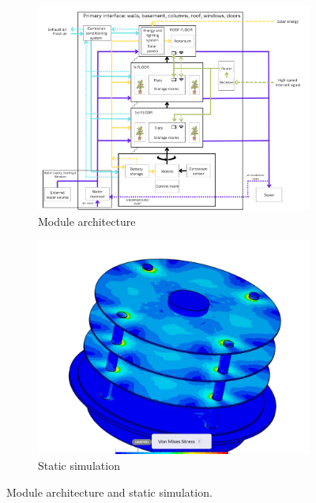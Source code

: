 \documentclass{PDS}
\begin{document}
\begin{figure}
    \begin{subfigure}[b]{0.49\textwidth}
        \includegraphics[width=\textwidth]{./figures/golazo-structure.png}
        \caption{Module architecture}
    \end{subfigure}
    \hfill
    \begin{subfigure}[b]{0.49\textwidth}
        \includegraphics[width=\textwidth]{./figures/golazo-sim.jpg}
        \caption{Static simulation}
    \end{subfigure}
    \caption{Module architecture and static simulation.}
\end{figure}
\end{document}
